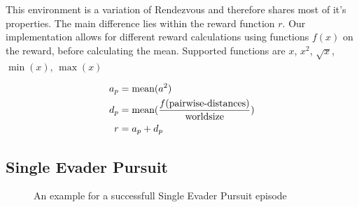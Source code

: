 This environment is a variation of Rendezvous and therefore shares most of it's properties. The main difference lies within the reward function $r$. Our implementation allows for different reward calculations using functions $f(x)$ on the reward, before calculating the mean. Supported functions are $x$, $x^2$, $\sqrt{x}$, $\min(x)$, $\max(x)$

\begin{equation}
    \begin{aligned}
        a_p &= \textup{mean}(a^2)\\
        d_p &= \textup{mean}(\frac{f(\textup{pairwise-distances})}{\textup{worldsize}}) \\
        r &= a_p + d_p
    \end{aligned}
    \nonumber
\end{equation}



\subsection{Single Evader Pursuit}
\begin{figure}[htp]
    \centering
    \hspace{1cm}                       
    \caption{An example for a successfull Single Evader Pursuit episode}
    \label{fig:single_evader_example}
\end{figure}

